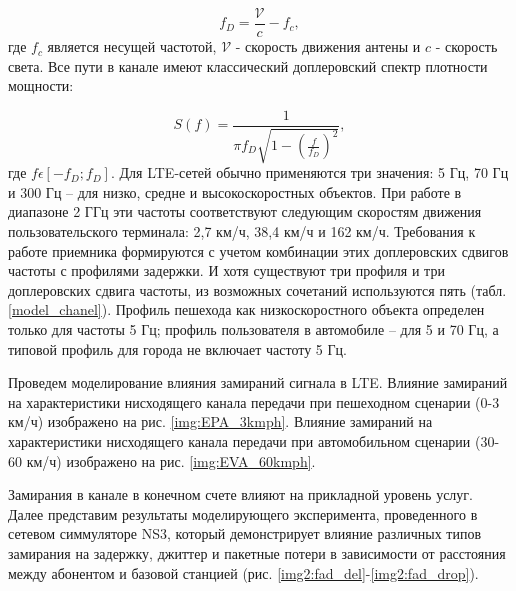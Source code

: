 \begin{equation}\label{eq:maxDeltaF}
f_{D}=\frac{\mathcal{V}}{c}-f_{c},
\end{equation}
\noindent где $f_{c}$ является несущей частотой, $\mathcal{V}$ - скорость движения антены и $c$ - скорость света. Все пути в канале имеют классический доплеровский спектр плотности мощности:

\begin{equation}\label{eq:maxDeltaF}
S(f)=\frac{1}{\pi f_D \sqrt{1-(\frac{f}{f_D})^2}},
\end{equation}
\noindent где $f\epsilon [-f_D;f_D]$. Для LTE-сетей обычно применяются три значения: 5 Гц, 70 Гц и 300 Гц – для низко, средне и высокоскоростных объектов. При работе в диапазоне 2 ГГц эти частоты соответствуют следующим скоростям движения пользовательского терминала: 2,7 км/ч, 38,4 км/ч и 162 км/ч. Требования к работе приемника формируются с учетом комбинации этих доплеровских сдвигов частоты с профилями задержки. И хотя существуют три профиля и три доплеровских сдвига частоты, из возможных сочетаний используются пять (табл. \ref{model_chanel}). Профиль пешехода как низкоскоростного объекта определен только для частоты 5 Гц; профиль пользователя в автомобиле – для 5 и 70 Гц, а типовой профиль для города не включает частоту 5 Гц.






Проведем моделирование влияния замираний сигнала в LTE. Влияние замираний на характеристики нисходящего канала передачи при пешеходном сценарии (0-3 км/ч) изображено на рис. \ref{img:EPA_3kmph}. Влияние замираний на характеристики нисходящего канала передачи при автомобильном сценарии (30-60 км/ч) изображено на рис. \ref{img:EVA_60kmph}.

Замирания в канале в конечном счете влияют на прикладной уровень услуг. Далее представим результаты моделирующего эксперимента, проведенного в сетевом симмуляторе NS3, который демонстрирует влияние различных типов замирания на задержку, джиттер и пакетные потери в зависимости от расстояния между абонентом и базовой станцией (рис. \ref{img2:fad_del}-\ref{img2:fad_drop}).


